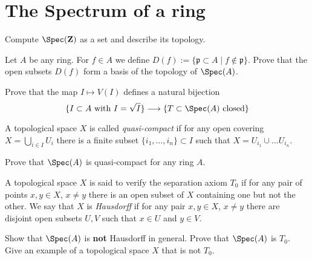 \section{The Spectrum of a ring}
\label{section-spectrum-ring}

\begin{exercise}
\label{exercise-spec-Z}
Compute $\Spec(\mathbf{Z})$ as a set and describe its topology.
\end{exercise}

\begin{exercise}
\label{exercise-basis-opens-standard}
Let $A$ be any ring. For $f\in A$ we define
$D(f):= \{\mathfrak p \subset A \mid f \not \in \mathfrak p\}$.
Prove that the open subsets $D(f)$ form a basis of the topology of
$\Spec(A)$.
\end{exercise}

\begin{exercise}
\label{exercise-radical-ideals-closed}
Prove that the map $I\mapsto V(I)$
defines a natural bijection
$$
\{I\subset A\text{ with }I = \sqrt{I}\}
\longrightarrow
\{T\subset \Spec(A)\text{ closed}\}
$$
\end{exercise}

\begin{definition}
\label{definition-quasi-compact}
A topological space $X$ is called {\it quasi-compact}
if for any open covering $X = \bigcup_{i\in I} U_i$ there is a finite
subset $\{i_1, \ldots, i_n\}\subset I$ such that $X = U_{i_1}\cup\ldots
U_{i_n}$.
\end{definition}

\begin{exercise}
\label{exercise-spec-quasi-compact}
Prove that $\Spec(A)$ is quasi-compact for any ring $A$.
\end{exercise}

\begin{definition}
\label{definition-Hausdorff}
A topological space $X$ is said to verify the separation axiom $T_0$
if for any pair of points $x, y\in X$, $x\not = y$ there is an open
subset of $X$ containing one but not the other.
We say that $X$ is {\it Hausdorff} if for any pair $x, y\in X$, $x\not = y$
there are disjoint open subsets $U, V$ such that $x\in U$
and $y\in V$.
\end{definition}

\begin{exercise}
\label{exercise-not-hausdorff}
Show that $\Spec(A)$ is {\bf not} Hausdorff in general.
Prove that $\Spec(A)$ is $T_0$. Give an example of a topological
space $X$ that is not $T_0$.
\end{exercise}

